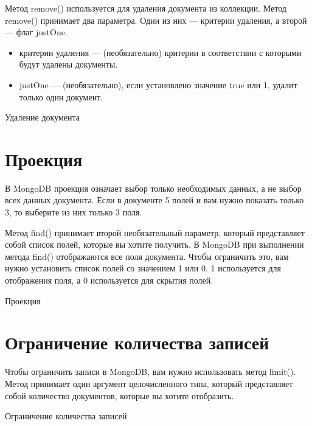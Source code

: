 Метод remove() используется для удаления документа из
коллекции. Метод remove() принимает два параметра. Один из них — критерии
удаления, а второй — флаг justOne.

\begin{itemize}
	\item критерии удаления — (необязательно) критерии в соответствии с
	которыми будут удалены документы.
	\item justOne — (необязательно), если установлено значение true или 1,
	удалит только один документ.
\end{itemize}

\begin{image}
	\caption{Удаление документа}
	\label{fig:remove}
\end{image}

\clearpage
\section{Проекция}

В MongoDB проекция означает выбор только необходимых данных, а не
выбор всех данных документа. Если в документе 5 полей и вам нужно показать
только 3, то выберите из них только 3 поля.\par
Метод find() принимает второй необязательный параметр, который
представляет собой список полей, которые вы хотите получить. В MongoDB при
выполнении метода find() отображаются все поля документа. Чтобы ограничить
это, вам нужно установить список полей со значением 1 или 0. 1 используется
для отображения поля, а 0 используется для скрытия полей.

\begin{image}
	\caption{Проекция}
	\label{fig:select}
\end{image}

\clearpage
\section{Ограничение количества записей}

Чтобы ограничить записи в MongoDB, вам нужно использовать метод
limit(). Метод принимает один аргумент целочисленного типа, который
представляет собой количество документов, которые вы хотите отобразить.

\begin{image}
	\caption{Ограничение количества записей}
	\label{fig:limit}
\end{image}

